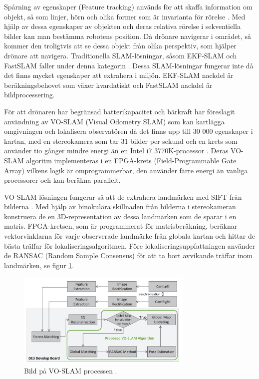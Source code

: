Spårning av egenskaper (Feature tracking) används för att skaffa information om objekt, så som linjer, hörn och olika former som är invarianta för rörelse \citep{geospatial}. Med hjälp av dessa egenskaper av objekten och deras relativa rörelse i sekventiella bilder kan man bestämma robotens position. Då drönare navigerar i området, så kommer den troligtvis att se dessa objekt från olika perspektiv, som hjälper drönare att navigera. Traditionella SLAM-lösningar, såsom EKF-SLAM och FastSLAM faller under denna kategorin \citep{voslamlatif}. Dessa SLAM-lösningar fungerar inte då det finns mycket egenskaper att extrahera i miljön. EKF-SLAM nackdel är beräkningsbehovet som växer kvardatiskt och FastSLAM nackdel är bildprocessering. 

För att drönaren har begränsad batterikapacitet och bärkraft har \cite{voslam} föreslagit användning av VO-SLAM (Visual Odometry SLAM) som kan kartlägga omgivningen och lokalisera observatören då det finns upp till 30 000 egenskaper i kartan, med en stereokamera som tar 31 bilder per sekund och en krets som använder tio gånger mindre energi än en Intel i7 3770K-processor \citep{voslam}. Deras VO-SLAM algoritm implementeras i en FPGA-krets (Field-Programmable Gate Array) vilkens logik är omprogrammerbar, den använder färre energi än vanliga processorer och kan beräkna parallelt. 

VO-SLAM-lösningen fungerar så att de extrahera landmärken med SIFT från bilderna \citep{voslam}. Med hjälp av binokulära skillnaden från bilderna i stereokameran konstruera de en 3D-representation av dessa landmärken som de sparar i en matris. FPGA-kretsen, som är programmerat för matrisberäkning, beräknar vektorvinklarna för varje observerade landmärke från globala kartan och hittar de bästa träffar för lokaliseringsalgoritmen. Före lokaliseringsuppfattningen använder de RANSAC (Random Sample Consensus) för att ta bort avvikande träffar inom landmärken, se figur \ref{voslamprocess}. 

\begin{figure}[ht]
    \begin{center}
    \includegraphics[width=0.75\textwidth]{voslam.JPG}
    \caption{Bild på VO-SLAM processen \citep{voslam}.}
    \label{voslamprocess}
    \end{center}
\end{figure}

